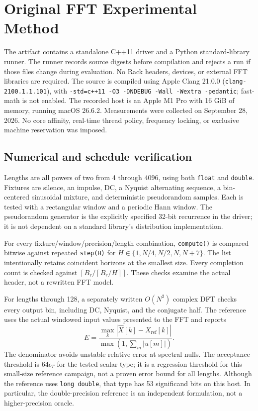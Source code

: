 \documentclass[11pt,letterpaper]{article}
\newcommand{\code}[1]{\texttt{#1}}
\newcommand{\ceil}[1]{\left\lceil #1\right\rceil}
\begin{document}
\section{Original FFT Experimental Method}
\label{sec:method}
The artifact contains a standalone C++11 driver and a Python standard-library
runner. The runner records source digests before compilation and rejects a run
if those files change during evaluation. No Rack headers, devices, or external
FFT libraries are required. The source is compiled using Apple Clang
21.0.0 (\code{clang-2100.1.1.101}), with
\code{-std=c++11 -O3 -DNDEBUG -Wall -Wextra -pedantic}; fast-math is not enabled.
The recorded host is an Apple M1 Pro with 16 GiB of memory, running macOS
26.6.2. Measurements were collected on September 28, 2026. No core affinity,
real-time thread policy, frequency locking, or exclusive machine reservation
was imposed.

\subsection{Numerical and schedule verification}
Lengths are all powers of two from 4 through 4096, using both \code{float}
and \code{double}. Fixtures are silence, an impulse, DC, a Nyquist alternating
sequence, a bin-centered sinusoidal mixture, and deterministic pseudorandom
samples. Each is tested with a rectangular window and a periodic Hann window.
The pseudorandom generator is the explicitly specified 32-bit recurrence in the
driver; it is not dependent on a standard library's distribution implementation.

For every fixture/window/precision/length combination, \code{compute()} is
compared bitwise against repeated \code{step(H)} for
$H\in\{1,N/4,N/2,N,N+7\}$. The list intentionally retains coincident horizons
at the smallest size. Every completion count is checked against
$\ceil{B_r/\ceil{B_r/H}}$. These checks examine the actual header, not a rewritten
FFT model.

For lengths through 128, a separately written $O(N^2)$ complex DFT checks every
output bin, including DC, Nyquist, and the conjugate half. The reference uses
the actual windowed input values presented to the FFT and reports
\begin{equation}
 E=\frac{\max_k|\widehat X[k]-X_{\mathrm{ref}}[k]|}
          {\max(1,\sum_m|u[m]|)}.
 \label{eq:error}
\end{equation}
The denominator avoids unstable relative error at spectral nulls. The acceptance
threshold is $64\epsilon_T$ for the tested scalar type; it is a regression
threshold for this small-size reference campaign, not a proven error bound for
all lengths. Although the reference uses \code{long double}, that type has 53
significand bits on this host. In particular, the double-precision reference is
an independent formulation, not a higher-precision oracle.
\end{document}
